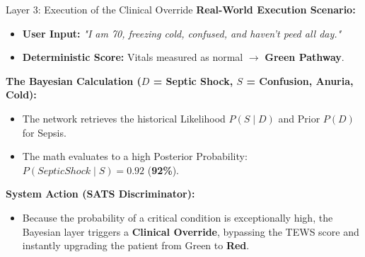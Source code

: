 \documentclass[11pt, aspectratio=169]{beamer}
\begin{document}
\begin{frame}{Layer 3: Execution of the Clinical Override}
	\textbf{Real-World Execution Scenario:}
	\begin{itemize}
		\item \textbf{User Input:} \textit{"I am 70, freezing cold, confused, and haven't peed all day."}
		\item \textbf{Deterministic Score:} Vitals measured as normal $\rightarrow$ \textcolor{triageGreen}{\textbf{Green Pathway}}.
	\end{itemize}
	\vspace{0.1cm}
	
	\textbf{The Bayesian Calculation ($D$ = Septic Shock, $S$ = Confusion, Anuria, Cold):}
	\begin{itemize}
		\item The network retrieves the historical Likelihood $P(S \mid D)$ and Prior $P(D)$ for Sepsis.
		\item The math evaluates to a high Posterior Probability: $P(Septic Shock \mid S) = \mathbf{0.92}$ (\textbf{92\%}).
	\end{itemize}
	\vspace{0.1cm}
	
	\textbf{System Action (SATS Discriminator):}
	\begin{itemize}
		\item Because the probability of a critical condition is exceptionally high, the Bayesian layer triggers a \textbf{Clinical Override}, bypassing the TEWS score and instantly upgrading the patient from Green to \textcolor{triageRed}{\textbf{Red}}.
	\end{itemize}
\end{frame}

\end{document}
